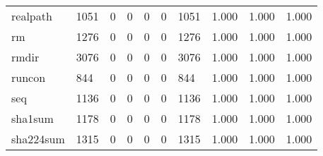 \begin{longtable}{lp{1.3cm}p{1.3cm}p{1.3cm}p{1.3cm}p{1.3cm}p{1.3cm}p{1.3cm}p{1.3cm}p{1.3cm}}
realpath  &                   1051 &                                  0 &                                 0 &                                0 &                                 0 &                            1051 &                                   1.000 &                                  1.000 &                                1.000 \\
rm        &                   1276 &                                  0 &                                 0 &                                0 &                                 0 &                            1276 &                                   1.000 &                                  1.000 &                                1.000 \\
rmdir     &                   3076 &                                  0 &                                 0 &                                0 &                                 0 &                            3076 &                                   1.000 &                                  1.000 &                                1.000 \\
runcon    &                    844 &                                  0 &                                 0 &                                0 &                                 0 &                             844 &                                   1.000 &                                  1.000 &                                1.000 \\
seq       &                   1136 &                                  0 &                                 0 &                                0 &                                 0 &                            1136 &                                   1.000 &                                  1.000 &                                1.000 \\
sha1sum   &                   1178 &                                  0 &                                 0 &                                0 &                                 0 &                            1178 &                                   1.000 &                                  1.000 &                                1.000 \\
sha224sum &                   1315 &                                  0 &                                 0 &                                0 &                                 0 &                            1315 &                                   1.000 &                                  1.000 &                                1.000 \\

\end{longtable}
